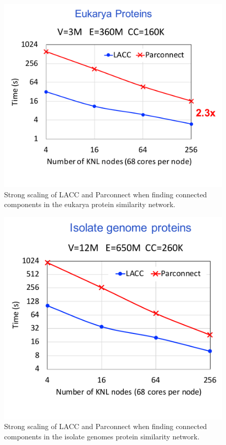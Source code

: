 \begin{figure}[!t]
   \centering
   \includegraphics[scale=.5]{figures/eukarya} %
   \caption{Strong scaling of LACC and Parconnect when finding connected components in  the eukarya protein similarity network. }
   \label{fig:eukarya}
\end{figure}

\begin{figure}[!t]
   \centering
   \includegraphics[scale=.5]{figures/isolates} %
   \caption{Strong scaling of LACC and Parconnect when finding connected components in  the isolate genomes protein similarity network. }
   \label{fig:isolates}
\end{figure}


